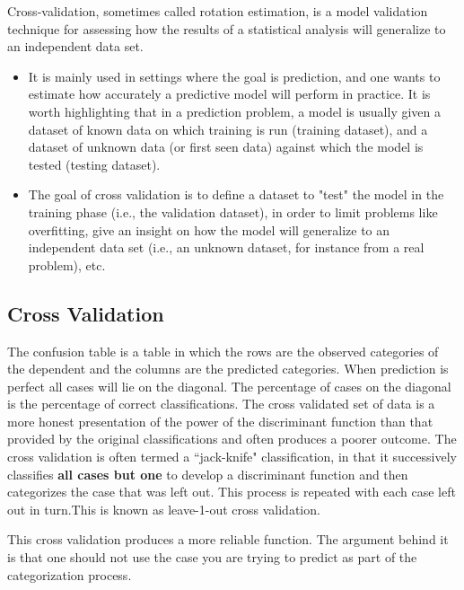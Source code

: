 \documentclass[a4paper,12pt]{article}
\begin{document}
Cross-validation, sometimes called rotation estimation, is a model validation technique for assessing how the results of a statistical analysis will generalize to an independent data set.
\begin{itemize}
\item It is mainly used in settings where the goal is prediction, and one wants to estimate how accurately a predictive model will perform in practice. It is worth highlighting that in a prediction problem, a model is usually given a dataset of known data on which training is run (training dataset), and a dataset of unknown data (or first seen data) against which the model is tested (testing dataset).
\item The goal of cross validation is to define a dataset to "test" the model in the training phase (i.e., the validation dataset), in order to limit problems like overfitting, give an insight on how the model will generalize to an independent data set (i.e., an unknown dataset, for instance from a real problem), etc.
\end{itemize}

\subsection{Cross Validation}

The confusion
table is a table in which the rows are the observed categories of the dependent and
the columns are the predicted categories. When prediction is perfect all cases will lie on the
diagonal. The percentage of cases on the diagonal is the percentage of correct classifications. 
The cross validated set of data is a more honest presentation of the power of the
discriminant function than that provided by the original classifications and often produces
a poorer outcome. The cross validation is often termed a ``jack-knife" classification, in that
it successively classifies \textbf{all cases but one} to develop a discriminant function and then
categorizes the case that was left out. This process is repeated with each case left out in
turn.This is known as leave-1-out cross validation. 

This cross validation produces a more reliable function. The argument behind it is that
one should not use the case you are trying to predict as part of the categorization process.


\end{document}
